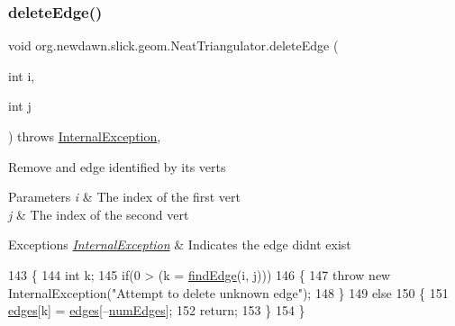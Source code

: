 \subsubsection{\texorpdfstring{delete\+Edge()}{deleteEdge()}}
{\footnotesize\ttfamily void org.\+newdawn.\+slick.\+geom.\+Neat\+Triangulator.\+delete\+Edge (\begin{DoxyParamCaption}\item[{int}]{i,  }\item[{int}]{j }\end{DoxyParamCaption}) throws \mbox{\hyperlink{classorg_1_1newdawn_1_1slick_1_1geom_1_1_neat_triangulator_1_1_internal_exception}{Internal\+Exception}}\hspace{0.3cm}{\ttfamily [inline]}, {\ttfamily [private]}}

Remove and edge identified by it\textquotesingle{}s verts


\begin{DoxyParams}{Parameters}
{\em i} & The index of the first vert \\
\hline
{\em j} & The index of the second vert \\
\hline
\end{DoxyParams}

\begin{DoxyExceptions}{Exceptions}
{\em \mbox{\hyperlink{classorg_1_1newdawn_1_1slick_1_1geom_1_1_neat_triangulator_1_1_internal_exception}{Internal\+Exception}}} & Indicates the edge didn\textquotesingle{}t exist \\
\hline
\end{DoxyExceptions}

\begin{DoxyCode}
143     \{
144         \textcolor{keywordtype}{int} k;
145         \textcolor{keywordflow}{if}(0 > (k = \mbox{\hyperlink{classorg_1_1newdawn_1_1slick_1_1geom_1_1_neat_triangulator_a78cbec0ff58e88805e3174b00ac42dc4}{findEdge}}(i, j)))
146         \{
147             \textcolor{keywordflow}{throw} \textcolor{keyword}{new} InternalException(\textcolor{stringliteral}{"Attempt to delete unknown edge"});
148         \} 
149         \textcolor{keywordflow}{else}
150         \{
151             \mbox{\hyperlink{classorg_1_1newdawn_1_1slick_1_1geom_1_1_neat_triangulator_a0abf260e1febb5ef0afc9894280f9efb}{edges}}[k] = \mbox{\hyperlink{classorg_1_1newdawn_1_1slick_1_1geom_1_1_neat_triangulator_a0abf260e1febb5ef0afc9894280f9efb}{edges}}[--\mbox{\hyperlink{classorg_1_1newdawn_1_1slick_1_1geom_1_1_neat_triangulator_a4c9fba4faad072774b3b0fcbc7fd0fff}{numEdges}}];
152             \textcolor{keywordflow}{return};
153         \}
154     \}
\end{DoxyCode}
\mbox{\label{classorg_1_1newdawn_1_1slick_1_1geom_1_1_neat_triangulator_a78cbec0ff58e88805e3174b00ac42dc4}} 
